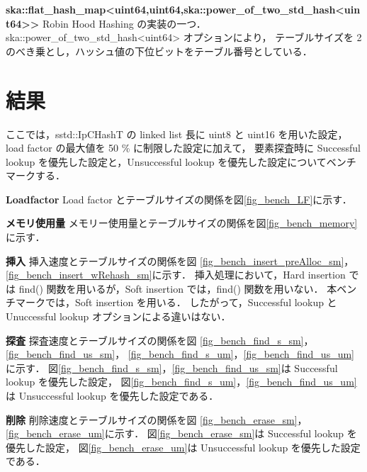%
{\bf ska::flat\_hash\_map<uint64,uint64,ska::power\_of\_two\_std\_hash<uint64>>}
\samepage\newline\indent
Robin Hood Hashing の実装の一つ．
ska::power\_of\_two\_std\_hash<uint64> オプションにより，
テーブルサイズを 2 のべき乗とし，ハッシュ値の下位ビットをテーブル番号としている．

\leavevmode \newline


\section{結果}
ここでは，sstd::IpCHashT の linked list 長に uint8 と uint16 を用いた設定，load factor の最大値を 50 \% に制限した設定に加えて，
要素探査時に Successful lookup を優先した設定と，Unsuccessful lookup を優先した設定についてベンチマークする．
\leavevmode \newline

%
{\bf Loadfactor}
\samepage\newline\indent
Load factor とテーブルサイズの関係を図\ref{fig_bench_LF}に示す．
\leavevmode \newline

%
{\bf メモリ使用量}
\samepage\newline\indent
メモリー使用量とテーブルサイズの関係を図\ref{fig_bench_memory}に示す．
\leavevmode \newline

%
{\bf 挿入}
\samepage\newline\indent
挿入速度とテーブルサイズの関係を図
\ref{fig_bench_insert_preAlloc_sm}，\ref{fig_bench_insert_wRehash_sm}に示す．
挿入処理において，Hard insertion では find() 関数を用いるが，Soft insertion では，find() 関数を用いない．
本ベンチマークでは，Soft insertion を用いる．
したがって，Successful lookup と Unuccessful lookup オプションによる違いはない．
\leavevmode \newline

%
{\bf 探査}
\samepage\newline\indent
探査速度とテーブルサイズの関係を図
\ref{fig_bench_find_s_sm}，\ref{fig_bench_find_us_sm}，
\ref{fig_bench_find_s_um}，\ref{fig_bench_find_us_um}に示す．
図\ref{fig_bench_find_s_sm}，\ref{fig_bench_find_us_sm}は Successful lookup を優先した設定，
図\ref{fig_bench_find_s_um}，\ref{fig_bench_find_us_um}は Unsuccessful lookup を優先した設定である．
\leavevmode \newline

%
{\bf 削除}
\samepage\newline\indent
削除速度とテーブルサイズの関係を図
\ref{fig_bench_erase_sm}，
\ref{fig_bench_erase_um}に示す．
図\ref{fig_bench_erase_sm}は Successful lookup を優先した設定，
図\ref{fig_bench_erase_um}は Unsuccessful lookup を優先した設定である．
\leavevmode \newline

